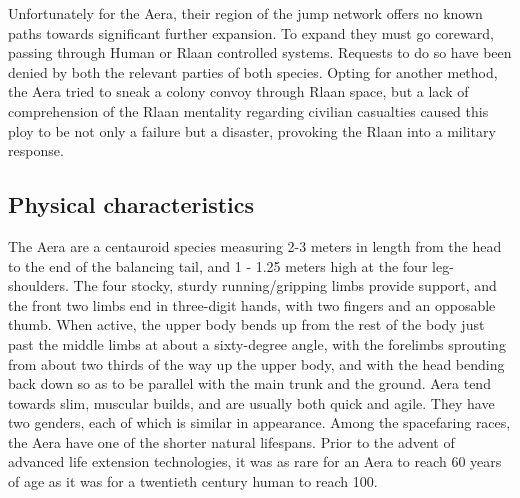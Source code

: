 Unfortunately for the Aera, their region of the jump network offers no
known paths towards significant further expansion. To expand they must
go coreward, passing through Human or Rlaan controlled
systems. Requests to do so have been denied by both the relevant
parties of both species. Opting for another method, the Aera tried to
sneak a colony convoy through Rlaan space, but a lack of comprehension
of the Rlaan mentality regarding civilian casualties caused this ploy
to be not only a failure but a disaster, provoking the Rlaan into a
military response.

\subsection{Physical characteristics}
The Aera are a centauroid species measuring 2-3 meters in length from
the head to the end of the balancing tail, and 1 - 1.25 meters high at
the four leg- shoulders. The four stocky, sturdy running/gripping
limbs provide support, and the front two limbs end in three-digit
hands, with two fingers and an opposable thumb. When active, the upper
body bends up from the rest of the body just past the middle limbs at
about a sixty-degree angle, with the forelimbs sprouting from about
two thirds of the way up the upper body, and with the head bending
back down so as to be parallel with the main trunk and the
ground. Aera tend towards slim, muscular builds, and are usually both
quick and agile. They have two genders, each of which is similar in
appearance. Among the spacefaring races, the Aera have one of the
shorter natural lifespans. Prior to the advent of advanced life
extension technologies, it was as rare for an Aera to reach 60 years
of age as it was for a twentieth century human to reach 100.

